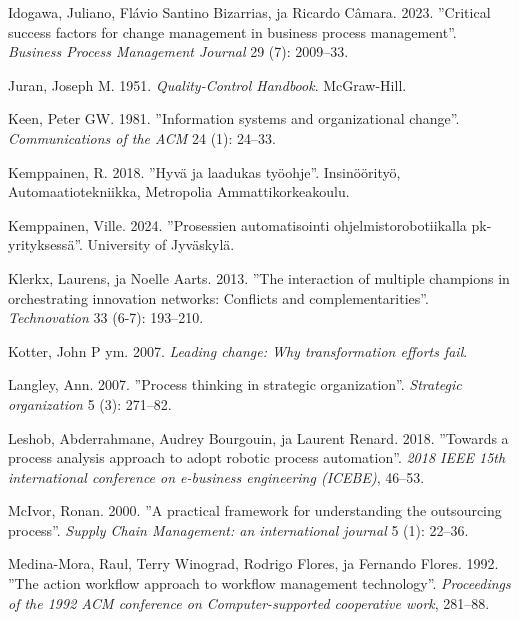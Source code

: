 \documentclass[
  finnish,
  letterpaper,
  DIV=11,
  numbers=noendperiod,
  oneside]{scrreprt}
\newlength{\cslhangindent}
\newenvironment{CSLReferences}[2] %
 {\begin{list}{}{%
  \setlength{\itemindent}{0pt}
  \setlength{\leftmargin}{0pt}
  \setlength{\parsep}{0pt}
  \ifodd #1
   \setlength{\leftmargin}{\cslhangindent}
   \setlength{\itemindent}{-1\cslhangindent}
  \fi
  \setlength{\itemsep}{#2\baselineskip}}}
 {\end{list}}
\begin{document}
\begin{CSLReferences}{1}{1}
Idogawa, Juliano, Flávio Santino Bizarrias, ja Ricardo Câmara. 2023.
{''Critical success factors for change management in business process
management''}. \emph{Business Process Management Journal} 29 (7):
2009--33.

Juran, Joseph M. 1951. \emph{Quality-Control Handbook}. McGraw-Hill.

Keen, Peter GW. 1981. {''Information systems and organizational
change''}. \emph{Communications of the ACM} 24 (1): 24--33.

Kemppainen, R. 2018. {''Hyvä ja laadukas työohje''}. Insinöörityö,
Automaatiotekniikka, Metropolia Ammattikorkeakoulu.

Kemppainen, Ville. 2024. {''Prosessien automatisointi
ohjelmistorobotiikalla pk-yrityksess{ä}''}. University of Jyv{ä}skyl{ä}.

Klerkx, Laurens, ja Noelle Aarts. 2013. {''The interaction of multiple
champions in orchestrating innovation networks: Conflicts and
complementarities''}. \emph{Technovation} 33 (6-7): 193--210.

{Kotter, John P ym.} 2007. \emph{Leading change: Why transformation
efforts fail}.

Langley, Ann. 2007. {''Process thinking in strategic organization''}.
\emph{Strategic organization} 5 (3): 271--82.

Leshob, Abderrahmane, Audrey Bourgouin, ja Laurent Renard. 2018.
{''Towards a process analysis approach to adopt robotic process
automation''}. \emph{2018 IEEE 15th international conference on
e-business engineering (ICEBE)}, 46--53.

McIvor, Ronan. 2000. {''A practical framework for understanding the
outsourcing process''}. \emph{Supply Chain Management: an international
journal} 5 (1): 22--36.

Medina-Mora, Raul, Terry Winograd, Rodrigo Flores, ja Fernando Flores.
1992. {''The action workflow approach to workflow management
technology''}. \emph{Proceedings of the 1992 ACM conference on
Computer-supported cooperative work}, 281--88.


\end{CSLReferences}
\end{document}
